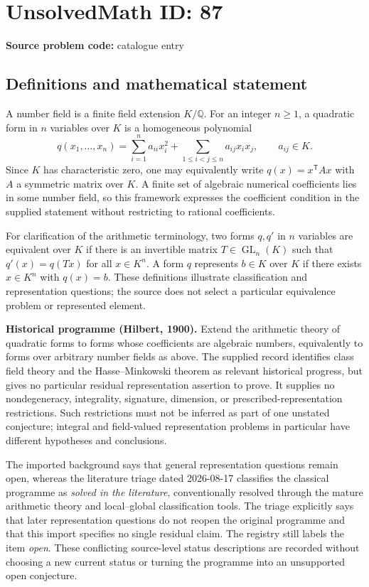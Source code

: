 \documentclass[11pt]{article}
\newcommand{\Q}{\mathbb{Q}}
\begin{document}
\section*{UnsolvedMath ID: 87}
\textbf{Source problem code:} catalogue entry
\subsection{Definitions and mathematical statement}
A number field is a finite field extension $K/\Q$. For an integer $n\geq1$, a quadratic form in $n$ variables over $K$ is a homogeneous polynomial
\[
 q(x_1,\ldots,x_n)=\sum_{i=1}^{n}a_{ii}x_i^2+
 \sum_{1\leq i<j\leq n}a_{ij}x_ix_j,\qquad a_{ij}\in K.
\]
Since $K$ has characteristic zero, one may equivalently write $q(x)=x^{\mathsf T}Ax$ with $A$ a symmetric matrix over $K$. A finite set of algebraic numerical coefficients lies in some number field, so this framework expresses the coefficient condition in the supplied statement without restricting to rational coefficients.

For clarification of the arithmetic terminology, two forms $q,q'$ in $n$ variables are equivalent over $K$ if there is an invertible matrix $T\in\operatorname{GL}_n(K)$ such that $q'(x)=q(Tx)$ for all $x\in K^n$. A form $q$ represents $b\in K$ over $K$ if there exists $x\in K^n$ with $q(x)=b$. These definitions illustrate classification and representation questions; the source does not select a particular equivalence problem or represented element.

\textbf{Historical programme (Hilbert, 1900).} Extend the arithmetic theory of quadratic forms to forms whose coefficients are algebraic numbers, equivalently to forms over arbitrary number fields as above. The supplied record identifies class field theory and the Hasse--Minkowski theorem as relevant historical progress, but gives no particular residual representation assertion to prove. It supplies no nondegeneracy, integrality, signature, dimension, or prescribed-representation restrictions. Such restrictions must not be inferred as part of one unstated conjecture; integral and field-valued representation problems in particular have different hypotheses and conclusions.

The imported background says that general representation questions remain open, whereas the literature triage dated 2026-08-17 classifies the classical programme as \emph{solved in the literature}, conventionally resolved through the mature arithmetic theory and local--global classification tools. The triage explicitly says that later representation questions do not reopen the original programme and that this import specifies no single residual claim. The registry still labels the item \emph{open}. These conflicting source-level status descriptions are recorded without choosing a new current status or turning the programme into an unsupported open conjecture.
\end{document}
